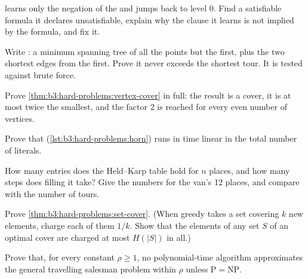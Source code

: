 \begin{exercise}[$\star\star$]\label{exo:b3:hard-problems:5}
 learns only the negation of the  and jumps back to level 0. Find a satisfiable formula it declares unsatisfiable, explain why the clause it learns is not implied by the formula, and fix it.
\end{exercise}

\begin{exercise}[$\star\star$]\label{exo:b3:hard-problems:6}
Write : a minimum spanning tree of all the points but the first, plus the two shortest edges from the first. Prove it never exceeds the shortest tour. It is tested against brute force.
\end{exercise}

\begin{exercise}[$\star\star$]\label{exo:b3:hard-problems:7}
Prove \cref{thm:b3:hard-problems:vertex-cover} in full: the result is a cover, it is at most twice the smallest, and the factor 2 is reached for every even number of vertices.
\end{exercise}

\begin{exercise}[$\star\star$]\label{exo:b3:hard-problems:8}
Prove that  (\cref{lst:b3:hard-problems:horn}) runs in time linear in the total number of literals.
\end{exercise}

\begin{exercise}[$\star\star$]\label{exo:b3:hard-problems:9}
How many entries does the Held--Karp table hold for $n$ places, and how many steps does filling it take? Give the numbers for the van's 12 places, and compare with the number of tours.
\end{exercise}

\begin{exercise}[$\star\star\star$]\label{exo:b3:hard-problems:10}
Prove \cref{thm:b3:hard-problems:set-cover}. (When greedy takes a set covering $k$ new elements, charge each of them $1/k$. Show that the elements of any set $S$ of an optimal cover are charged at most $H(|S|)$ in all.)
\end{exercise}

\begin{exercise}[$\star\star\star$]\label{exo:b3:hard-problems:11}
Prove that, for every constant $\rho \ge 1$, no polynomial-time algorithm approximates the general travelling salesman problem within $\rho$ unless $\mathrm{P} = \mathrm{NP}$.
\end{exercise}

